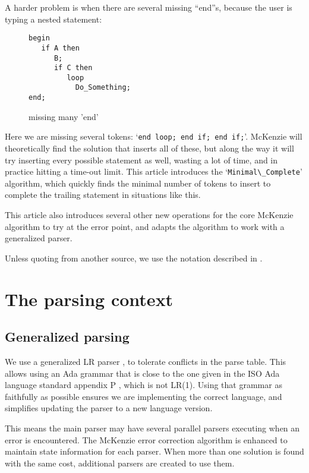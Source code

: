 \documentclass{article}
\newcommand{\code}[1]{`\lstinline|#1|'}
\begin{document}
A harder problem is when there are several missing ``end''s, because
the user is typing a nested statement:
\begin{figure}[H]
\begin{lstlisting}
begin
   if A then
      B;
      if C then
         loop
           Do_Something;
end;
\end{lstlisting}
\caption{missing many 'end'}
\label{ex:min_com_if_if_loop}
\end{figure}

Here we are missing several tokens: \code{end loop; end if; end if;}.
McKenzie will theoretically find the solution that inserts all of
these, but along the way it will try inserting every possible
statement as well, wasting a lot of time, and in practice hitting a
time-out limit. This article introduces the \code{Minimal\_Complete}
algorithm, which quickly finds the minimal number of tokens to insert
to complete the trailing statement in situations like this.

This article also introduces several other new operations for the core
McKenzie algorithm to try at the error point, and adapts the algorithm
to work with a generalized parser.

Unless quoting from another source, we use the notation described in
\cite{DeRemer 1982}.


\section{The parsing context}
\subsection{Generalized parsing}
We use a generalized LR parser \cite{Tomita 1986}, to tolerate
conflicts in the parse table. This allows using an Ada grammar that is
close to the one given in the ISO Ada language standard appendix P
\cite{Ada 2012}, which is not LR(1). Using that grammar as faithfully
as possible ensures we are implementing the correct language, and
simplifies updating the parser to a new language version.

This means the main parser may have several parallel parsers executing
when an error is encountered. The McKenzie error correction algorithm
is enhanced to maintain state information for each parser. When more
than one solution is found with the same cost, additional parsers are
created to use them.
\end{document}
